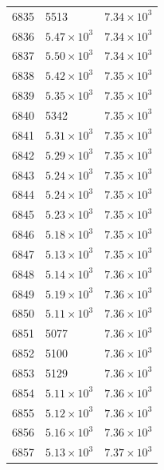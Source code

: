 \begin{table}[H]
\begin{tabular}{lll}
6835 & 5513 & $\displaystyle 7.34 \times 10^{3}$ \\
6836 & $\displaystyle 5.47 \times 10^{3}$ & $\displaystyle 7.34 \times 10^{3}$ \\
6837 & $\displaystyle 5.50 \times 10^{3}$ & $\displaystyle 7.34 \times 10^{3}$ \\
6838 & $\displaystyle 5.42 \times 10^{3}$ & $\displaystyle 7.35 \times 10^{3}$ \\
6839 & $\displaystyle 5.35 \times 10^{3}$ & $\displaystyle 7.35 \times 10^{3}$ \\
6840 & 5342 & $\displaystyle 7.35 \times 10^{3}$ \\
6841 & $\displaystyle 5.31 \times 10^{3}$ & $\displaystyle 7.35 \times 10^{3}$ \\
6842 & $\displaystyle 5.29 \times 10^{3}$ & $\displaystyle 7.35 \times 10^{3}$ \\
6843 & $\displaystyle 5.24 \times 10^{3}$ & $\displaystyle 7.35 \times 10^{3}$ \\
6844 & $\displaystyle 5.24 \times 10^{3}$ & $\displaystyle 7.35 \times 10^{3}$ \\
6845 & $\displaystyle 5.23 \times 10^{3}$ & $\displaystyle 7.35 \times 10^{3}$ \\
6846 & $\displaystyle 5.18 \times 10^{3}$ & $\displaystyle 7.35 \times 10^{3}$ \\
6847 & $\displaystyle 5.13 \times 10^{3}$ & $\displaystyle 7.35 \times 10^{3}$ \\
6848 & $\displaystyle 5.14 \times 10^{3}$ & $\displaystyle 7.36 \times 10^{3}$ \\
6849 & $\displaystyle 5.19 \times 10^{3}$ & $\displaystyle 7.36 \times 10^{3}$ \\
6850 & $\displaystyle 5.11 \times 10^{3}$ & $\displaystyle 7.36 \times 10^{3}$ \\
6851 & 5077 & $\displaystyle 7.36 \times 10^{3}$ \\
6852 & 5100 & $\displaystyle 7.36 \times 10^{3}$ \\
6853 & 5129 & $\displaystyle 7.36 \times 10^{3}$ \\
6854 & $\displaystyle 5.11 \times 10^{3}$ & $\displaystyle 7.36 \times 10^{3}$ \\
6855 & $\displaystyle 5.12 \times 10^{3}$ & $\displaystyle 7.36 \times 10^{3}$ \\
6856 & $\displaystyle 5.16 \times 10^{3}$ & $\displaystyle 7.36 \times 10^{3}$ \\
6857 & $\displaystyle 5.13 \times 10^{3}$ & $\displaystyle 7.37 \times 10^{3}$ \\

\end{tabular}
\end{table}
